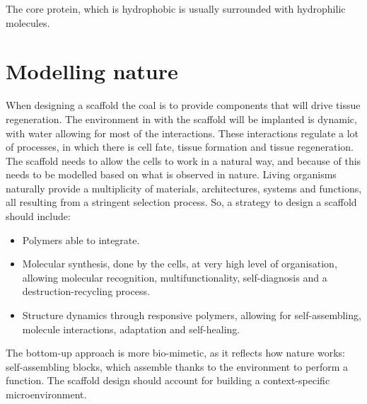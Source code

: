 		The core protein, which is hydrophobic is usually surrounded with hydrophilic molecules.

\section{Modelling nature}
When designing a scaffold the coal is to provide components that will drive tissue regeneration.
The environment in with the scaffold will be implanted is dynamic, with water allowing for most of the interactions.
These interactions regulate a lot of processes, in which there is cell fate, tissue formation and tissue regeneration.
The scaffold needs to allow the cells to work in a natural way, and because of this needs to be modelled based on what is observed in nature.
Living organisms naturally provide a multiplicity of materials, architectures, systems and functions, all resulting from a stringent selection process.
So, a strategy to design a scaffold should include:

\begin{multicols}{2}
	\begin{itemize}
		\item Polymers able to integrate.
		\item Molecular synthesis, done by the cells, at very high level of organisation, allowing molecular recognition, multifunctionality, self-diagnosis and a destruction-recycling process.
		\item Structure dynamics through responsive polymers, allowing for self-assembling, molecule interactions, adaptation and self-healing.
	\end{itemize}
\end{multicols}

The bottom-up approach is more bio-mimetic, as it reflects how nature works: self-assembling blocks, which assemble thanks to the environment to perform a function.
The scaffold design should account for building a context-specific microenvironment.
